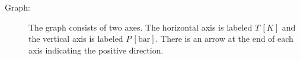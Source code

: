 

\item[a)] 
    \begin{description}
        \item[Graph:] 
        The graph consists of two axes. The horizontal axis is labeled \( T \, [K] \) and the vertical axis is labeled \( P \, [\text{bar}] \). There is an arrow at the end of each axis indicating the positive direction.
    \end{description}